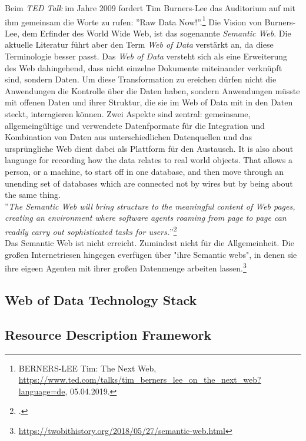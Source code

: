 \documentclass[12pt,a4paper]{article}
\begin{document}
Beim \textit{TED Talk} im Jahre 2009 fordert Tim Burners-Lee das Auditorium auf mit ihm gemeinsam die Worte zu rufen: ''Raw Data Now!''.\footnote{BERNERS-LEE Tim: The Next Web, \url{https://www.ted.com/talks/tim_berners_lee_on_the_next_web?language=de}, 05.04.2019.} Die Vision von Burners-Lee, dem Erfinder des World Wide Web, ist das sogenannte \textit{Semantic Web}. Die aktuelle Literatur führt aber den Term \textit{Web of Data} verstärkt an, da diese Terminologie besser passt. Das \textit{Web of Data} versteht sich als eine Erweiterung des Web dahingehend, dass nicht einzelne Dokumente miteinander verknüpft sind, sondern Daten. Um diese Transformation zu ereichen dürfen nicht die Anwendungen die Kontrolle über die Daten haben, sondern Anwendungen müsste mit offenen Daten und ihrer Struktur, die sie im Web of Data mit in den Daten steckt, interagieren können. Zwei Aspekte sind zentral: gemeinsame, allgemeingültige und verwendete Datenfpormate für die Integration und Kombination von Daten aus unterschiedlichen Datenquellen und das ursprüngliche Web dient dabei als Plattform für den Austausch. It is also about language for recording how the data relates to real world objects. That allows a person, or a machine, to start off in one database, and then move through an unending set of databases which are connected not by wires but by being about the same thing.
\\
''\textit{The Semantic Web will bring structure to the meaningful content of Web pages, creating an environment where software agents roaming from page to page can readily carry out sophisticated tasks for users.}''\footcite[][S.3]{berners2001semantic}
\\
Das Semantic Web ist nicht erreicht. Zumindest nicht für die Allgemeinheit. Die großen Internetriesen hingegen everfügen über "ihre Semantic webs", in denen sie ihre eigeen Agenten mit ihrer großen Datenmenge arbeiten lassen.\footnote{\url{https://twobithistory.org/2018/05/27/semantic-web.html}}

\subsection{Web of Data Technology Stack}
\subsection{Resource Description Framework}
\end{document}
